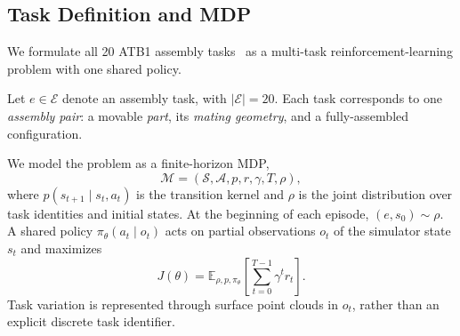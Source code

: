 \subsection{Task Definition and MDP}
\label{sec:task_mdp}
We formulate all 20 ATB1 assembly tasks~\cite{kimble2020benchmarking}
as a multi-task reinforcement-learning problem with one shared policy.

Let $e \in \mathcal{E}$ denote an assembly task, with $|\mathcal{E}|=20$.
Each task corresponds to one \textit{assembly pair}: a movable \textit{part}, its \textit{mating geometry}, and a fully-assembled configuration.

We model the problem as a finite-horizon MDP,
\begin{equation}
    \mathcal{M}=(\mathcal{S},\mathcal{A},p,r,\gamma,T,\rho),
\end{equation}
where $p(s_{t+1}\mid s_t,a_t)$ is the transition kernel and $\rho$
is the joint distribution over task identities and initial states.
At the beginning of each episode, $(e,s_0)\sim\rho$.
A shared policy $\pi_\theta(a_t\mid o_t)$ acts on partial observations
$o_t$ of the simulator state $s_t$ and maximizes
\begin{equation}
    J(\theta)
    =
    \mathbb{E}_{\rho,p,\pi_\theta}
    \left[
        \sum_{t=0}^{T-1}\gamma^t r_t
    \right].
    \label{eq:objective}
\end{equation}
Task variation is represented through surface point clouds in $o_t$, 
rather than an explicit discrete task identifier.
